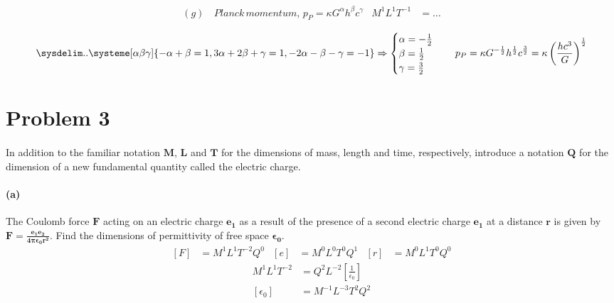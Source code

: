 \documentclass[]{article}
\begin{document}
{			\begin{equation*}	
				\begin{aligned}
					(g) & \, Planck \, momentum, \, p_P = \kappa G^{\alpha} h^{\beta} c^{\gamma}  & M^1 L^1 T^{-1} &= \dots 
					\\
				\end{aligned}
			\end{equation*}
				\begin{equation*}
					\sysdelim..\systeme[\alpha\beta\gamma]{
						-\alpha + \beta = 1, 
						3\alpha + 2\beta + \gamma = 1,
						-2\alpha - \beta - \gamma = -1
					} \Rightarrow
					\begin{cases}
						\alpha = -\frac{1}{2} \\ 
						\beta = \frac{1}{2} \\
						\gamma = \frac{3}{2}
					\end{cases}
					\quad
					p_P = \kappa G^{-\frac{1}{2}} h^{\frac{1}{2}} c^{\frac{3}{2}} = \kappa \left( \frac{hc^3}{G} \right)^\frac{1}{2}
				\end{equation*}
			
			
	\section*{Problem 3}

		\paragraph{} In addition to the familiar notation $\bm{M}$, $\bm{L}$ and $\bm{T}$ for the dimensions of mass, length and time, respectively, introduce a notation $\bm{Q}$ for the dimension of a new fundamental quantity called the electric charge.
		
		\paragraph*{(a)} The Coulomb force $\bm{F}$ acting on an electric charge $\bm{e_1}$ as a result of the presence of a second electric charge $\bm{e_1}$ at a distance $\bm{r}$ is given by $\bm{F = \frac{e_1 e_2}{4\pi \epsilon_0 r^2}}$. Find the dimensions of permittivity of free space $\bm{\epsilon_0}$.
			\begin{equation*}
				\begin{aligned}
					\left[ F \right] &= M^1 L^1 T^{-2} Q^0 & \left[ e \right] &= M^0 L^0 T^0 Q^1  & \left[ r \right] &= M^0 L^1 T^0 Q^0
				\end{aligned}
			\end{equation*}
			\begin{equation*}
				\begin{split}
					M^1 L^1 T^{-2} &= Q^2 L^{-2} \left[ \frac{1}{\epsilon_0} \right] \\
					[\epsilon_0] &= M^{-1} L^{-3} T^2 Q^2
				\end{split}
			\end{equation*}
		
}
\end{document}
